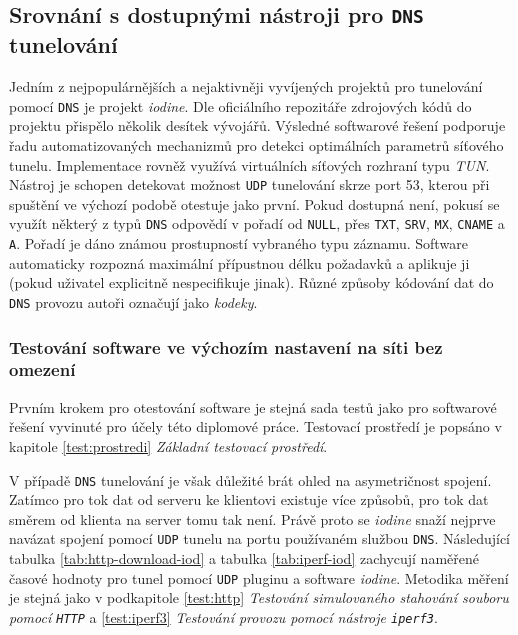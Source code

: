 \documentclass[thesis=M,czech]{FITthesis}[2012/10/20]
\begin{document}
\subsection{Srovnání s dostupnými nástroji pro \texttt{DNS} tunelování}

Jedním z nejpopulárnějších a nejaktivněji vyvíjených projektů pro tunelování pomocí \texttt{DNS} je projekt \textit{iodine}. Dle oficiálního repozitáře zdrojových kódů\cite{iodine-repo} do projektu přispělo několik desítek vývojářů. Výsledné softwarové řešení podporuje řadu automatizovaných mechanizmů pro detekci optimálních parametrů síťového tunelu. Implementace rovněž využívá virtuálních síťových rozhraní typu \textit{TUN}. Nástroj je schopen detekovat možnost \texttt{UDP} tunelování skrze port 53, kterou při spuštění ve výchozí podobě otestuje jako první. Pokud dostupná není, pokusí se využít některý z typů \texttt{DNS} odpovědí v pořadí od \texttt{NULL}, přes \texttt{TXT}, \texttt{SRV}, \texttt{MX}, \texttt{CNAME} a \texttt{A}. Pořadí je dáno známou prostupností vybraného typu záznamu\cite{iodine-repo}. Software automaticky rozpozná maximální přípustnou délku požadavků a aplikuje ji (pokud uživatel explicitně nespecifikuje jinak). Různé způsoby kódování dat do \texttt{DNS} provozu autoři označují jako \textit{kodeky}.

\subsubsection{Testování software ve výchozím nastavení na síti bez omezení}

Prvním krokem pro otestování software je stejná sada testů jako pro softwarové řešení vyvinuté pro účely této diplomové práce. Testovací prostředí je popsáno v kapitole \ref{test:prostredi} \textit{Základní testovací prostředí}.

V případě \texttt{DNS} tunelování je však důležité brát ohled na asymetričnost spojení. Zatímco pro tok dat od serveru ke klientovi existuje více způsobů, pro tok dat směrem od klienta na server tomu tak není. Právě proto se \textit{iodine} snaží nejprve navázat spojení pomocí \texttt{UDP} tunelu na portu používaném službou \texttt{DNS}. Následující tabulka \ref{tab:http-download-iod} a tabulka \ref{tab:iperf-iod} zachycují naměřené časové hodnoty pro tunel pomocí \texttt{UDP} pluginu a software \textit{iodine}. Metodika měření je stejná jako v podkapitole \ref{test:http} \textit{Testování simulovaného stahování souboru pomocí \texttt{HTTP}} a \ref{test:iperf3} \textit{Testování provozu pomocí nástroje \texttt{iperf3}}.
\end{document}
